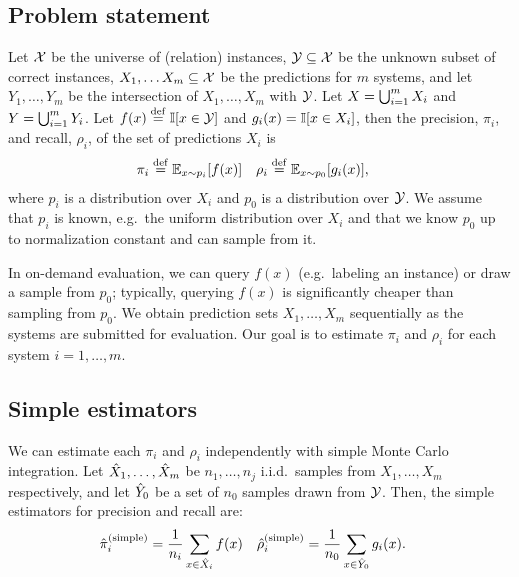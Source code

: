 \subsection{Problem statement}
Let $\mathcal{X}$ be the universe of %
(relation) instances,
  $\mathcal{Y} \subseteq \mathcal{X}$ be the unknown subset of correct instances,
  $X_1, \ldots X_m \subseteq \mathcal{X}$ be the predictions for $m$ systems,
  and let $Y_1, \ldots, Y_m$ be the intersection of $X_1, \ldots, X_m$ with $\mathcal{Y}$.
Let $X = \bigcup_{i=1}^m X_i$ and $Y = \bigcup_{i=1}^m Y_i$.
Let $f(x) \stackrel{\rm def}{=} \mathbb{I}[x \in \mathcal{Y}]$ and $g_i(x) = \mathbb{I}[x \in X_i]$, then the precision, $\pi_i$, and recall, $\rho_i$, of the set of predictions $X_i$ is
\begin{align*}
  \pi_i  &\stackrel{\rm def}{=} \mathbb{E}_{x \sim p_i}[f(x)] &
  \rho_i &\stackrel{\rm def}{=} \mathbb{E}_{x \sim p_0}[g_i(x)],
\end{align*}
where $p_i$ is a distribution over $X_i$ and $p_0$ is a distribution over $\mathcal{Y}$.
We assume that $p_i$ is known, e.g.\, the uniform distribution over $X_i$
and that we know $p_0$ up to normalization constant and can sample from it.

In on-demand evaluation, we can query $f(x)$ (e.g.\, labeling an instance) or draw a sample from $p_0$;
typically, querying $f(x)$ is significantly cheaper than sampling from $p_0$.
We obtain prediction sets $X_1, \ldots, X_m$ sequentially as the systems are submitted for evaluation.
Our goal is to estimate $\pi_i$ and $\rho_i$ for each system $i = 1, \dots, m$.

\subsection{Simple estimators}
We can estimate each $\pi_i$ and $\rho_i$ independently with simple Monte Carlo integration. %
Let ${\hat{X}}_1, \ldots, {\hat{X}}_m$ be $n_1, \ldots, n_j$ i.i.d.~samples from $X_1, \ldots, X_m$ respectively, and let ${\hat{Y}}_0$ be a set of $n_0$ samples drawn from $\mathcal{Y}$.
Then, the simple estimators for precision and recall are:
\begin{align}
  {\hat{\pi}}_i^{\text{(simple)}} &= \frac1{n_i} \sum_{x \in {\hat{X}}_i} f(x) & {\hat{\rho}}_i^{\text{(simple)}} &= \frac1{n_0} \sum_{x \in {\hat{Y}}_0} g_i(x).
\end{align}

